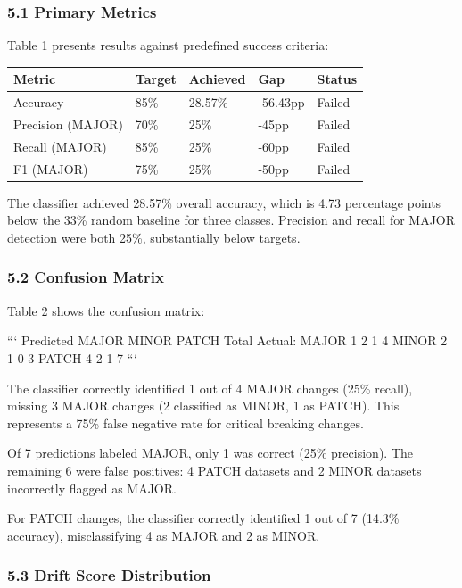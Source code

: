 
\subsubsection{5.1 Primary Metrics}

Table 1 presents results against predefined success criteria:

\begin{table}[htbp]
\centering
\begin{tabular}{lllll}
\toprule
Metric & Target & Achieved & Gap & Status \\
\midrule
Accuracy & 85\% & 28.57\% & -56.43pp & Failed \\
Precision (MAJOR) & 70\% & 25\% & -45pp & Failed \\
Recall (MAJOR) & 85\% & 25\% & -60pp & Failed \\
F1 (MAJOR) & 75\% & 25\% & -50pp & Failed \\
\bottomrule
\end{tabular}
\end{table}

The classifier achieved 28.57\% overall accuracy, which is 4.73 percentage points below the 33\% random baseline for three classes. Precision and recall for MAJOR detection were both 25\%, substantially below targets.

\subsubsection{5.2 Confusion Matrix}

Table 2 shows the confusion matrix:

```
              Predicted
           MAJOR  MINOR  PATCH  Total
Actual:
MAJOR        1      2      1      4
MINOR        2      1      0      3
PATCH        4      2      1      7
```

The classifier correctly identified 1 out of 4 MAJOR changes (25\% recall), missing 3 MAJOR changes (2 classified as MINOR, 1 as PATCH). This represents a 75\% false negative rate for critical breaking changes.

Of 7 predictions labeled MAJOR, only 1 was correct (25\% precision). The remaining 6 were false positives: 4 PATCH datasets and 2 MINOR datasets incorrectly flagged as MAJOR.

For PATCH changes, the classifier correctly identified 1 out of 7 (14.3\% accuracy), misclassifying 4 as MAJOR and 2 as MINOR.

\subsubsection{5.3 Drift Score Distribution}

